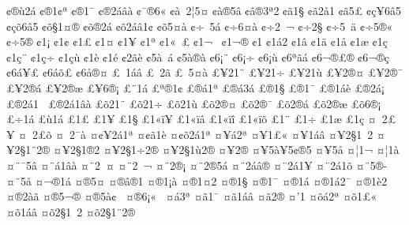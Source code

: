 {^^a2^^ae^^f92^^e1
^^a2^^ae1^^a2^^aa
^^a2^^ae1^^af
^^a2^^ae2^^e1^^e2^^e0
^^a2^^af^^ae6^^ab
^^a2^^e0^^a02^^a65^^a4
^^a2^^e0^^ae5^^e2
^^a2^^e2^^ae3^^aa2
^^a2^^e31^^a7
^^a2^^e32^^e51
^^a2^^e35^^a3
^^a2^^e7^^a56^^e25
^^a2^^e7^^f56^^e25
^^a2^^f5^^a71^^a4^^ae
^^a2^^f5^^ae2^^e1
^^a2^^f52^^e1^^e21^^a2
^^a2^^f55^^a4^^e0
^^a2^^f7^^a05^^e1
^^a2^^f7^^ad6^^a4^^e0
^^a2^^f72^^a0^^ac
^^a2^^f72^^a7^^ad
^^a2^^f75^^a0^^e4
^^a2^^f75^^ae^^ab
^^a2^^f75^^ae^^ad
^^a21^^a1
^^a21^^a2
^^a21^^a3
^^a21^^a4
^^a21^^a5
^^a21^^aa
^^a21^^ab^^a0^^a3
^^a21^^ac^^a0
^^a21^^ac^^ae
^^a21^^ad
^^a21^^e12
^^a21^^e2
^^a21^^e4
^^a21^^e5
^^a21^^e6
^^a21^^e7^^a0
^^a21^^e7^^a8
^^a21^^e7^^f7
^^a21^^e7^^f9
^^a21^^e8
^^a21^^e9
^^a22^^ad^^e3^^e8
^^a25^^e0^^a0^^e1
^^a25^^e0^^ae^^e0
^^a26^^a1^^a8
^^a26^^a1^^f7
^^a26^^a1^^f9
^^a26^^aa^^e3^^e1
^^a26^^ac^^ae^^a3^^ae
^^a26^^ac^^ae^^e7
^^a26^^e1^^a5^^a3
^^a26^^e1^^f5^^a3
^^a26^^e5^^ae^^a4
^^a3^^a01^^e1^^e2
^^a3^^a02^^e3
^^a3^^a05^^a4^^e0
^^a3^^a52^^ad1^^a8^^ad
^^a3^^a52^^ad1^^f7^^ad
^^a3^^a52^^ad1^^f9^^ad
^^a3^^a52^^ae^^a4
^^a3^^a52^^ae^^af
^^a3^^a52^^ae^^e1
^^a3^^a52^^ae^^e6
^^a3^^a56^^ae^^a1
^^a3^^a81^^e1
^^a3^^aa^^ae1^^a2
^^a3^^ae^^e11^^aa
^^a3^^ae^^e13^^e1
^^a3^^ae1^^a7
^^a3^^ae1^^af
^^a3^^ae1^^e1^^e8
^^a3^^ae2^^e1^^a1
^^a3^^ae2^^e11^^a0
^^a3^^ae2^^e11^^e2^^e0
^^a3^^f52^^ad1^^a8^^ad
^^a3^^f52^^ad1^^f7^^ad
^^a3^^f52^^ad1^^f9^^ad
^^a3^^f52^^ae^^a4
^^a3^^f52^^ae^^af
^^a3^^f52^^ae^^e1
^^a3^^f52^^ae^^e6
^^a3^^f56^^ae^^a1
^^a3^^f71^^e1
^^a3^^f91^^e1
^^a31^^a3
^^a31^^a5
^^a31^^a7
^^a31^^ab^^ef^^a5
^^a31^^ab^^ef^^e2
^^a31^^ab^^ef^^ee
^^a31^^ab^^ef^^f5
^^a31^^ad^^a8
^^a31^^ad^^f7
^^a31^^e6
^^a31^^e7
^^a4^^a02^^a3^^a5^^ad
^^a4^^a02^^a3^^f5^^ad
^^a4^^a02^^af^^e0
^^a4^^a2^^a52^^e11^^aa
^^a4^^a2^^e31^^e8
^^a4^^a2^^f52^^e11^^aa
^^a4^^a5^^e12^^aa
^^a4^^a51^^a3^^ab
^^a4^^a51^^e1^^e2
^^a4^^a52^^a71^^a02
^^a4^^a52^^a71^^a82^^ae
^^a4^^a52^^a71^^ae2
^^a4^^a52^^a71^^f72^^ae
^^a4^^a52^^a71^^f92^^ae
^^a4^^a52^^ae
^^a4^^a55^^e0^^a55^^a2^^ae5
^^a4^^a55^^e5
^^a4^^a61^^ac
^^a4^^a61^^e0
^^a4^^a8^^af5^^e2
^^a4^^a8^^e11^^e2^^e0
^^a4^^a82^^a0^^a4
^^a4^^a82^^a0^^ac
^^a4^^a82^^ae^^a1
^^a4^^a82^^ae5^^e1
^^a4^^a82^^e1^^e2^^ae
^^a4^^a82^^e11^^a5
^^a4^^a82^^e11^^f5
^^a4^^a85^^ae^^ad
^^a4^^a85^^e5
^^a4^^ac^^ae1^^e1
^^a4^^ad^^ae5^^a4
^^a4^^ae^^e2^^ae1
^^a4^^ae1^^a1^^e0
^^a4^^ae1^^a42
^^a4^^ae1^^a7
^^a4^^ae1^^af
^^a4^^ae1^^e1^^ad
^^a4^^ae1^^e12^^af
^^a4^^ae1^^e82
^^a4^^ae2^^e0^^e3
^^a4^^ae5^^ac^^ad^^ae
^^a4^^ae5^^e0^^a2^^a0
^^a4^^ae6^^a1^^ab^^a0
^^a4^^e13^^aa^^ad
^^a4^^e31^^af
^^a4^^e31^^e1^^e2
^^a4^^e32^^ae
^^a4'1
^^a4^^f5^^e12^^aa
^^a4^^f51^^a3^^ab
^^a4^^f51^^e1^^e2
^^a4^^f52^^a71^^a02
^^a4^^f52^^a71^^a82^^ae
}
